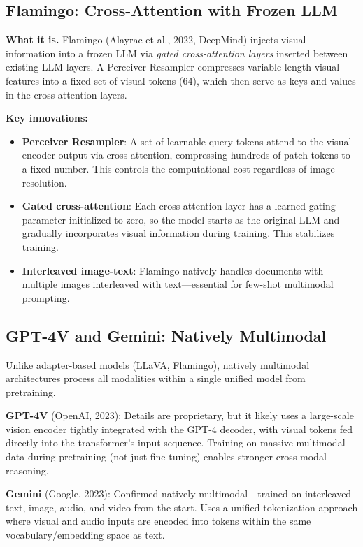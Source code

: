 \subsection{Flamingo: Cross-Attention with Frozen LLM}

\textbf{What it is.} Flamingo (Alayrac et al., 2022, DeepMind) injects visual information into a frozen LLM via \textit{gated cross-attention layers} inserted between existing LLM layers. A Perceiver Resampler compresses variable-length visual features into a fixed set of visual tokens (64), which then serve as keys and values in the cross-attention layers.

\textbf{Key innovations:}
\begin{itemize}
    \item \textbf{Perceiver Resampler}: A set of learnable query tokens attend to the visual encoder output via cross-attention, compressing hundreds of patch tokens to a fixed number. This controls the computational cost regardless of image resolution.
    \item \textbf{Gated cross-attention}: Each cross-attention layer has a learned gating parameter initialized to zero, so the model starts as the original LLM and gradually incorporates visual information during training. This stabilizes training.
    \item \textbf{Interleaved image-text}: Flamingo natively handles documents with multiple images interleaved with text---essential for few-shot multimodal prompting.
\end{itemize}

\subsection{GPT-4V and Gemini: Natively Multimodal}

Unlike adapter-based models (LLaVA, Flamingo), natively multimodal architectures process all modalities within a single unified model from pretraining.

\textbf{GPT-4V} (OpenAI, 2023): Details are proprietary, but it likely uses a large-scale vision encoder tightly integrated with the GPT-4 decoder, with visual tokens fed directly into the transformer's input sequence. Training on massive multimodal data during pretraining (not just fine-tuning) enables stronger cross-modal reasoning.

\textbf{Gemini} (Google, 2023): Confirmed natively multimodal---trained on interleaved text, image, audio, and video from the start. Uses a unified tokenization approach where visual and audio inputs are encoded into tokens within the same vocabulary/embedding space as text.

